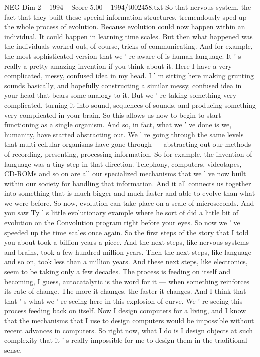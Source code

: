 \begin{textsample}{NEG Dim 2 – 1994 – Score 5.00 – 1994/t002458.txt}
So that nervous system, the fact that they built these special information structures, tremendously sped up the whole process of evolution.
Because evolution could now happen within an individual.
It could happen in learning time scales.
But then what happened was the individuals worked out, of course, tricks of communicating.
And for example, the most sophisticated version that we ' re aware of is human language.
It ' s really a pretty amazing invention if you think about it.
Here I have a very complicated, messy, confused idea in my head.
I ' m sitting here making grunting sounds basically, and hopefully constructing a similar messy, confused idea in your head that bears some analogy to it.
But we ' re taking something very complicated, turning it into sound, sequences of sounds, and producing something very complicated in your brain.
So this allows us now to begin to start functioning as a single organism.
And so, in fact, what we ' ve done is we, humanity, have started abstracting out.
We ' re going through the same levels that multi-cellular organisms have gone through — abstracting out our methods of recording, presenting, processing information.
So for example, the invention of language was a tiny step in that direction.
Telephony, computers, videotapes, CD-ROMs and so on are all our specialized mechanisms that we ' ve now built within our society for handling that information.
And it all connects us together into something that is much bigger and much faster and able to evolve than what we were before.
So now, evolution can take place on a scale of microseconds.
And you saw Ty ' s little evolutionary example where he sort of did a little bit of evolution on the Convolution program right before your eyes.
So now we ' ve speeded up the time scales once again.
So the first steps of the story that I told you about took a billion years a piece.
And the next steps, like nervous systems and brains, took a few hundred million years.
Then the next steps, like language and so on, took less than a million years.
And these next steps, like electronics, seem to be taking only a few decades.
The process is feeding on itself and becoming, I guess, autocatalytic is the word for it — when something reinforces its rate of change.
The more it changes, the faster it changes.
And I think that that ' s what we ' re seeing here in this explosion of curve.
We ' re seeing this process feeding back on itself.
Now I design computers for a living, and I know that the mechanisms that I use to design computers would be impossible without recent advances in computers.
So right now, what I do is I design objects at such complexity that it ' s really impossible for me to design them in the traditional sense.

\end{textsample}
